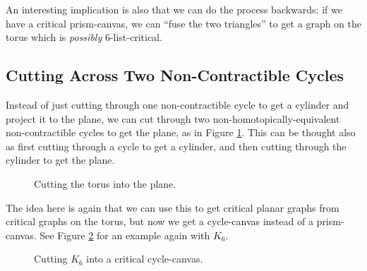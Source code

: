 An interesting implication is also that we can do the process backwards: if we have a critical 
prism-canvas, we can ``fuse the two triangles'' to get a graph on the torus which is 
\emph{possibly} $6$-list-critical.   

\subsection{Cutting Across Two Non-Contractible Cycles}

Instead of just cutting through one non-contractible cycle to get a cylinder and project it to the
plane, we can cut through two non-homotopically-equivalent non-contractible cycles to get the 
plane, as in Figure \ref{fig:twocycles_illustration}. This can be thought also as first cutting 
through a cycle to get a cylinder, and then cutting through the cylinder to get the plane. 

\begin{figure}

\centering
{}
\caption{Cutting the torus into the plane.}
\label{fig:twocycles_illustration}
\end{figure}

The idea here is again that we can use this to get critical planar graphs from critical graphs
on the torus, but now we get a cycle-canvas instead of a prism-canvas. See Figure \ref{fig:k6_cyclecanvas} for an example again with $K_6$.

\begin{figure}

\centering
{}
\caption{Cutting $K_6$ into a critical cycle-canvas.}
\label{fig:k6_cyclecanvas}
\end{figure}

